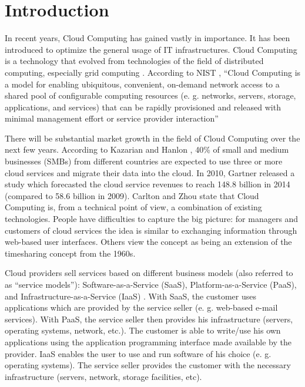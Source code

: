 \documentclass[runningheads,a4paper]{llncs}
\begin{document}
\section{Introduction}

In recent years, Cloud Computing has gained vastly in importance. It has been introduced to optimize the general usage of IT infrastructures. Cloud Computing is a technology that evolved from technologies of the field of distributed computing, especially grid computing \cite{Foster2009}. According to NIST \cite{Mell2011}, ``Cloud Computing is a model for enabling ubiquitous, convenient, on-demand network access to a shared pool of configurable computing resources (e. g. networks, servers, storage, applications, and services) that can be rapidly provisioned and released with minimal management effort or service provider interaction''

There will be substantial market growth in the field of Cloud Computing over the next few years. According to Kazarian and Hanlon \cite{Kazarian2010}, 40\% of small and medium businesses (SMBs) from different countries are expected to use three or more cloud services and migrate their data into the cloud. In 2010, Gartner \cite{Gartner2010} released a study which forecasted the cloud service revenues to reach 148.8 billion in 2014 (compared to 58.6 billion in 2009). Carlton and Zhou \cite{Carlton2011} state that Cloud Computing is, from a technical point of view, a combination of existing technologies. People have difficulties to capture the big picture: for managers and customers of cloud services the idea is similar to exchanging information through web-based user interfaces. Others view the concept as being an extension of the timesharing concept from the 1960s. 

Cloud providers sell services based on different business models (also referred to as ``service models''): Software-as-a-Service (SaaS), Platform-as-a-Service (PaaS), and Infrastructure-as-a-Service (IaaS) \cite{Mason2011,Dillon2010}. With SaaS, the customer uses applications which are provided by the service seller (e. g. web-based e-mail services). With PaaS, the service seller then provides his infrastructure (servers, operating systems, network, etc.). The customer is able to write/use his own applications using the application programming interface made available by the provider. IaaS enables the user to use and run software of his choice (e. g. operating systems). The service seller provides the customer with the necessary infrastructure (servers, network, storage facilities, etc). 
\end{document}

